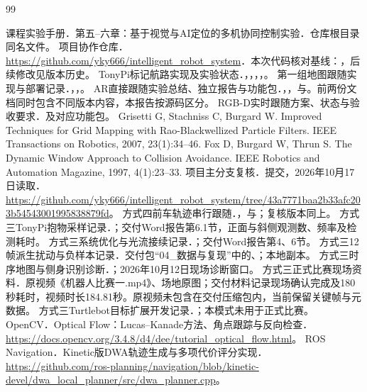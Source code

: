 \begin{thebibliography}{99}
 课程实验手册．第五--六章：基于视觉与AI定位的多机协同控制实验．仓库根目录同名文件。
 项目协作仓库．\url{https://github.com/yky666/intelligent_robot_system}．本次代码核对基线：，后续修改见版本历史。
 TonyPi标记航路实现及实验状态．，，，，。
 第一组地图跟随实现与部署记录．，，。
 AR直接跟随实验总结、独立报告与功能包．，，与。前两份文档同时包含不同版本内容，本报告按源码区分。
 RGB-D实时跟随方案、状态与验收要求．及对应功能包。
 Grisetti G, Stachniss C, Burgard W. Improved Techniques for Grid Mapping with Rao-Blackwellized Particle Filters. IEEE Transactions on Robotics, 2007, 23(1):34--46.
 Fox D, Burgard W, Thrun S. The Dynamic Window Approach to Collision Avoidance. IEEE Robotics and Automation Magazine, 1997, 4(1):23--33.
 项目主分支复核．提交，2026年10月17日读取．\url{https://github.com/yky666/intelligent_robot_system/tree/43a7771baa2b33afc203b54543001995838879fd}。
 方式四前车轨迹串行跟随．，与；复核版本同上。
 方式三TonyPi抱物采样记录．；交付Word报告第6.1节，正面与斜侧观测数、频率及检测耗时。
 方式三系统优化与光流接续记录．；交付Word报告第4、6节。
 方式三12帧派生扰动与负样本记录．交付包“04\_数据与复现”中的、；本地副本。
 方式三时序地图与侧身识别诊断．；2026年10月12日现场诊断窗口。
 方式三正式比赛现场资料．原视频《机器人比赛一.mp4》、场地原图；交付材料记录现场确认完成及180秒耗时，视频时长184.81秒。原视频未包含在交付压缩包内，当前保留关键帧与元数据。
 方式三Turtlebot目标扩展开发记录．；本模式未用于正式比赛。
 OpenCV．Optical Flow：Lucas--Kanade方法、角点跟踪与反向检查．\url{https://docs.opencv.org/3.4.8/d4/dee/tutorial_optical_flow.html}。
 ROS Navigation．Kinetic版DWA轨迹生成与多项代价评分实现．\url{https://github.com/ros-planning/navigation/blob/kinetic-devel/dwa_local_planner/src/dwa_planner.cpp}。
\end{thebibliography}
